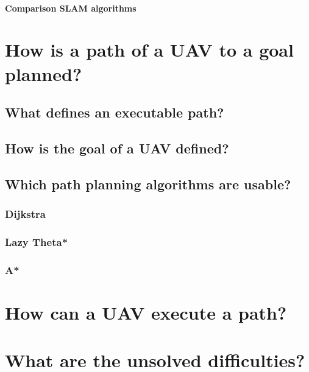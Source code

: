 \documentclass[12pt, a4paper]{report}
\begin{document}
          \paragraph{Comparison SLAM algorithms}
          
          \clearpage
    \section{How is a path of a UAV to a goal planned?}
    
      \subsection{What defines an executable path?}
      
      \clearpage
      \subsection{How is the goal of a UAV defined?}
      
      \subsection{Which path planning algorithms are usable?}
      
        \subsubsection{Dijkstra}
        
        \clearpage
        \subsubsection{Lazy Theta*}
        
        \subsubsection{A*}
        
        \clearpage
    \section{How can a UAV execute a path?}
    
    \clearpage
    \section{What are the unsolved difficulties?}
    

  
  \printbibliography[heading=none]
\end{document}
